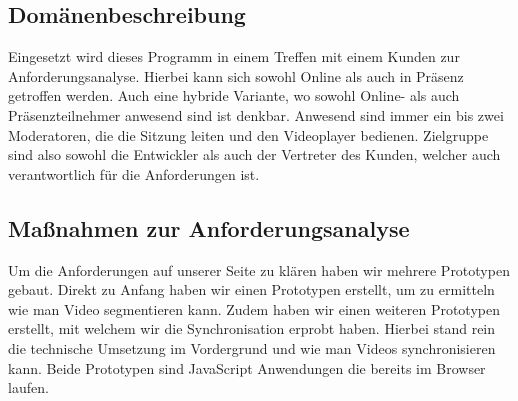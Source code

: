 \subsection{Domänenbeschreibung}
    Eingesetzt wird dieses Programm in einem Treffen mit einem Kunden zur Anforderungsanalyse.
    Hierbei kann sich sowohl Online als auch in Präsenz getroffen werden. Auch eine hybride Variante,
    wo sowohl Online- als auch Präsenzteilnehmer anwesend sind ist denkbar. 
    Anwesend sind immer ein bis zwei Moderatoren, die die Sitzung leiten und den Videoplayer bedienen.
	Zielgruppe sind also sowohl die Entwickler als auch der Vertreter des Kunden, welcher auch verantwortlich für die Anforderungen ist.
\subsection{Maßnahmen zur Anforderungsanalyse}
    Um die Anforderungen auf unserer Seite zu klären haben wir mehrere Prototypen gebaut.
    Direkt zu Anfang haben wir einen Prototypen erstellt, um zu ermitteln wie man Video segmentieren kann.
    Zudem haben wir einen weiteren Prototypen erstellt, mit welchem wir die Synchronisation erprobt haben.
    Hierbei stand rein die technische Umsetzung im Vordergrund und wie man Videos synchronisieren kann.
    Beide Prototypen sind JavaScript Anwendungen die bereits im Browser laufen.
